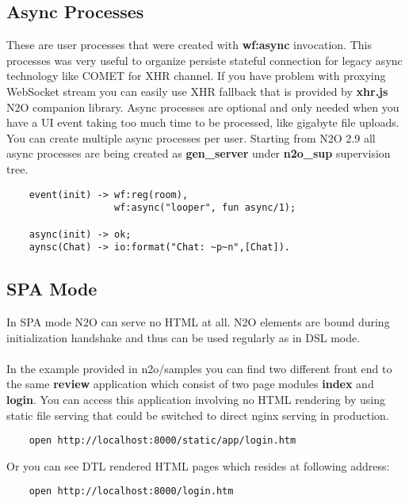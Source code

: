 \subsection{Async Processes}
These are user processes that were created with {\bf wf:async} invocation.
This processes was very useful to organize persiste stateful connection
for legacy async technology like COMET for XHR channel. If you have problem with
proxying WebSocket stream you can easily use XHR fallback that is
provided by {\bf xhr.js} N2O companion library.
Async processes are optional and only needed when you have a UI event taking too much
time to be processed, like gigabyte file uploads. You can create
multiple async processes per user. Starting from N2O 2.9 all async
processes are being created as {\bf gen\_server} under
{\bf n2o\_sup} supervision tree.

\vspace{1\baselineskip}
\begin{lstlisting}
    event(init) -> wf:reg(room),
                   wf:async("looper", fun async/1);

    async(init) -> ok;
    aynsc(Chat) -> io:format("Chat: ~p~n",[Chat]).
\end{lstlisting}
\vspace{1\baselineskip}

\newpage
\subsection{SPA Mode}
In SPA mode N2O can serve no HTML at all. N2O elements are
bound during initialization handshake and thus can be used
regularly as in DSL mode.

\paragraph{}
In the example provided in n2o/samples you can find two different
front end to the same {\bf review} application which consist of
two page modules {\bf index} and {\bf login}. You can access this application
involving no HTML rendering by using static file serving that could be
switched to direct nginx serving in production.

\vspace{1\baselineskip}
\begin{lstlisting}
    open http://localhost:8000/static/app/login.htm
\end{lstlisting}
\vspace{1\baselineskip}

Or you can see DTL rendered HTML pages which resides at following address:

\vspace{1\baselineskip}
\begin{lstlisting}
    open http://localhost:8000/login.htm
\end{lstlisting}
\vspace{1\baselineskip}

